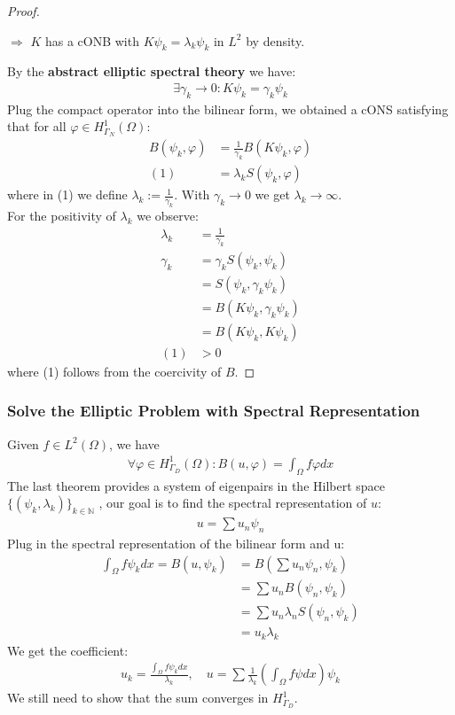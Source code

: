 \documentclass[a4paper,11pt,oneside,fleqn]{book}
\theoremstyle{definition}
\theoremstyle{remark}
\begin{document}
\begin{proof}
\begin{itemize}
	$\Rightarrow$ $K$ has a cONB with $K \psi_k = \lambda_k \psi_k$ in $L^2$ by density.
\end{itemize}
By the \textbf{abstract elliptic spectral theory} we have:
\begin{align*}
	\exists \gamma_k \rightarrow 0: K\psi_k = \gamma_k \psi_k
\end{align*}
Plug the compact operator into the bilinear form, we obtained a cONS satisfying that for all $\varphi \in H^1_{\Gamma_N}(\Omega)$:
\begin{align*}
	B(\psi_k, \varphi) &= \frac{1}{\gamma_k} B(K\psi_k, \varphi)\\
	(1) &= \lambda_k S(\psi_k, \varphi)
\end{align*}
where in (1) we define $\lambda_k := \frac{1}{\gamma_k}$. With $\gamma_k \rightarrow 0$ we get $\lambda_k \rightarrow \infty$.\\
For the positivity of $\lambda_k$ we observe:
\begin{align*}
	\lambda_k &= \frac{1}{\gamma_k}\\
	\gamma_k &= \gamma_k S(\psi_k, \psi_k) \\
	&= S(\psi_k, \gamma_k \psi_k)\\
	&= B(K\psi_k, \gamma_k \psi_k)\\
	&= B(K \psi_k, K \psi_k)\\
	(1)&>0 
\end{align*}
where (1) follows from the coercivity of $B$.
\end{proof}


\subsubsection*{Solve the Elliptic Problem with Spectral Representation}
Given $f \in L^2(\Omega)$, we have
\begin{align*}
	\forall \varphi \in H^1_{\Gamma_D}(\Omega): B(u, \varphi) = \int_\Omega f \varphi dx
\end{align*}
The last theorem provides a system of eigenpairs in the Hilbert space $\{(\psi_k, \lambda_k)\}_{k \in \mathbb{N}}$ , our goal is to find the spectral representation of $u$:
\begin{align*}
	u = \sum u_n \psi_n
\end{align*}
Plug in the spectral representation of the bilinear form and u:
\begin{align*}
	\int_\Omega f\psi_k dx =B(u, \psi_k) &= B(\sum u_n \psi_n, \psi_k)\\
	&= \sum u_n B(\psi_n, \psi_k)\\
	&= \sum u_n \lambda_n S(\psi_n, \psi_k) \\
	&= u_k \lambda_k
\end{align*}
We get the coefficient:
\begin{align*}
	u_k = \frac{\int_\Omega f \psi_k dx}{\lambda_k}, \quad 
	u= \sum \frac{1}{\lambda_k}( \int_\Omega f \psi dx ) \psi_k
\end{align*}
We still need to show that the sum converges in $H^1_{\Gamma_D}$.
\end{document}
